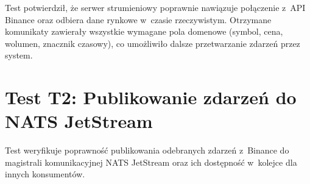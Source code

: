 Test potwierdził, że serwer strumieniowy poprawnie nawiązuje połączenie z~API Binance oraz odbiera dane rynkowe
w~czasie rzeczywistym.
Otrzymane komunikaty zawierały wszystkie wymagane pola domenowe (symbol, cena, wolumen, znacznik czasowy), co
umożliwiło dalsze przetwarzanie zdarzeń przez system.

\newpage


\section{Test T2: Publikowanie zdarzeń do NATS JetStream}
\label{sec:test_nats_publish}

Test weryfikuje poprawność publikowania odebranych zdarzeń z~Binance do magistrali komunikacyjnej NATS JetStream oraz
ich dostępność w~kolejce dla innych konsumentów.

\vspace{0.5cm}

